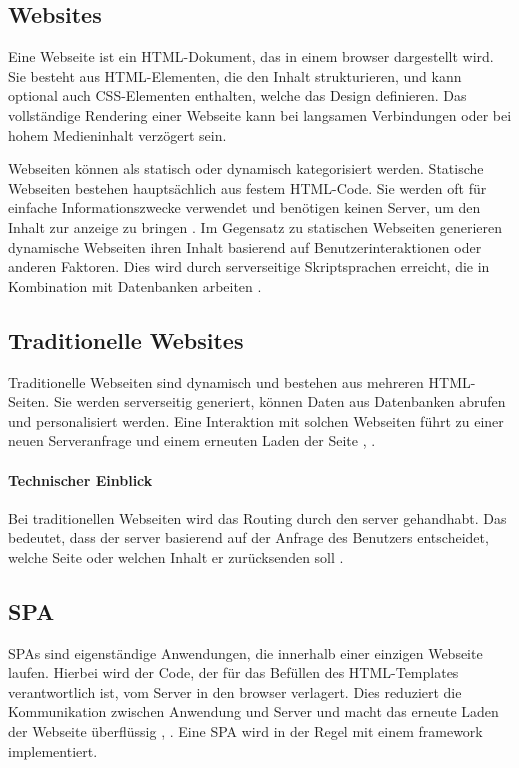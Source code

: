 \subsection{Websites}
Eine Webseite ist ein \ac{HTML}-Dokument, das in einem \gls{browser} dargestellt wird.
Sie besteht aus \ac{HTML}-Elementen, die den Inhalt strukturieren, und kann optional auch \ac{CSS}-Elementen enthalten, welche das Design definieren.
Das vollständige Rendering einer Webseite kann bei langsamen Verbindungen oder bei hohem Medieninhalt verzögert sein.

Webseiten können als statisch oder dynamisch kategorisiert werden.
Statische Webseiten bestehen hauptsächlich aus festem HTML-Code.
Sie werden oft für einfache Informationszwecke verwendet und benötigen keinen Server, um den Inhalt zur anzeige zu bringen \cite{Robbins2018}.
Im Gegensatz zu statischen Webseiten generieren dynamische Webseiten ihren Inhalt basierend auf Benutzerinteraktionen oder anderen Faktoren.
Dies wird durch serverseitige Skriptsprachen erreicht, die in Kombination mit Datenbanken arbeiten \cite{Robbins2018}.

\subsection{Traditionelle Websites}
Traditionelle Webseiten sind dynamisch und bestehen aus mehreren \ac{HTML}-Seiten.
Sie werden serverseitig generiert, können Daten aus Datenbanken abrufen und personalisiert werden.
Eine Interaktion mit solchen Webseiten führt zu einer neuen Serveranfrage und einem erneuten Laden der Seite \cite{Robbins2018}, \cite{Scott2015}.

\paragraph*{Technischer Einblick}
Bei traditionellen Webseiten wird das Routing durch den \gls{server} gehandhabt.
Das bedeutet, dass der \gls{server} basierend auf der Anfrage des Benutzers entscheidet, welche Seite oder welchen Inhalt er zurücksenden soll \cite{Robbins2018}.

\subsection{\ac{SPA}}
\ac{SPA}s sind eigenständige Anwendungen, die innerhalb einer einzigen Webseite laufen.
Hierbei wird der Code, der für das Befüllen des \ac{HTML}-Templates verantwortlich ist, vom Server in den \gls{browser} verlagert.
Dies reduziert die Kommunikation zwischen Anwendung und Server und macht das erneute Laden der Webseite überflüssig \cite{Flanagan2011}, \cite{Doguhan2020}.
Eine \ac{SPA} wird in der Regel mit einem \gls{framework} implementiert.

